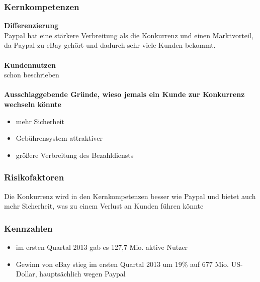 \subsubsection{Kernkompetenzen}
\textbf{Differenzierung}\\
Paypal hat eine stärkere Verbreitung als die Konkurrenz und einen Marktvorteil, da Paypal zu eBay gehört und dadurch sehr viele Kunden bekommt.\\
\\
\textbf{Kundennutzen}\\
schon beschrieben\\
\\
\textbf{Ausschlaggebende Gründe, wieso jemals ein Kunde zur Konkurrenz wechseln könnte}
\begin{itemize}
\item mehr Sicherheit
\item Gebührensystem attraktiver
\item größere Verbreitung des Bezahldiensts
\end{itemize}

\subsubsection{Risikofaktoren}
Die Konkurrenz wird in den Kernkompetenzen besser wie Paypal und bietet auch mehr Sicherheit, was zu einem Verlust an Kunden führen könnte

\subsubsection{Kennzahlen}
\begin{itemize}
\item im ersten Quartal 2013 gab es 127,7 Mio. aktive Nutzer
\item Gewinn von eBay stieg im ersten Quartal 2013 um 19\% auf 677 Mio. US-Dollar, hauptsächlich wegen Paypal
\end{itemize}